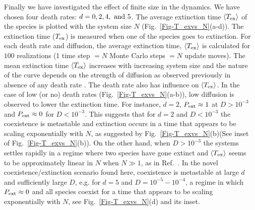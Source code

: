 \documentclass[aps, pre, twocolumn, amsmath, superscriptaddress,showkeys,showpacs]{revtex4-1}
\begin{document}
{{{%
}	
 	
\par  Finally we have investigated the effect of finite size in the dynamics. We have chosen four death rates: $d=0,2,4,~{\rm and} ~5$. The average extinction time $\langle T_{\rm ex}\rangle$ of the species is plotted with the system size $N$ (Fig.\ \ref{Fig-T_exvs_N}(a-d)).   The %
	extinction time {($T_{\rm ex}$)} is measured when one of the species goes to extinction. For each death rate and diffusion, {the average extinction time,} $\langle T_{\rm ex}\rangle$ is calculated for $100$ realizations (1 time step $=N$ Monte Carlo steps $=N$ update moves). The mean extinction time
$\langle T_{\rm ex}\rangle$ increases with increasing system size and the nature of the curve depends on the strength of diffusion as observed previously in absence of any death rate \cite{he2011coexistence}. The death rate also has influence on $\langle T_{\rm ex}\rangle$. In the case of low (or no) death rates (Fig.\ \ref{Fig-T_exvs_N}(a-b)), low diffusion is observed to lower the extinction time.
{ For instance,  $d=2$, $P_{\rm ext}\approx 1$ at $D>10^{-3}$ and $P_{\rm ext}\approx 0$ for $D<10^{-3}$. This suggests that for $d=2$ and $D<10^{-3}$ the coexistence is metastable and extinction occurs in a  time that appears to be scaling exponentially with $N$, as suggested by Fig.~\ref{Fig-T_exvs_N}(b)(See inset of Fig.~\ref{Fig-T_exvs_N}(b)). On the other hand, when $D>10^{-3}$ the systems settles rapidly in a regime where two species have gone extinct and $\langle T_{\rm ex}\rangle$ seems to be approximately linear in $N$ when $N\gg 1$, as in Ref.~\cite{he2011coexistence}.
In the novel coexistence/extinction scenario found here, 
coexistence is metastable at large $d$ and sufficiently large $D$, e.g. for $d=5$ and $D=10^{-5}-10^{-4}$, a regime in which  $P_{\rm ext}\approx 0$ and all species coexist for a  time that appears to be scaling exponentially with $N$, see Fig.~\ref{Fig-T_exvs_N}(d) and its inset. %
}}}
\end{document}
